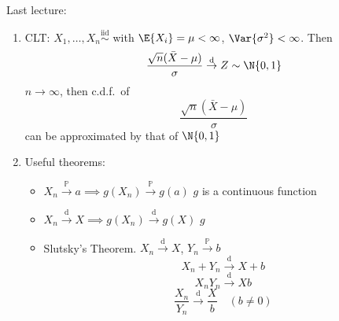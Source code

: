 Last lecture:
\begin{enumerate}
    \item CLT\@: $ X_1,\ldots,X_n \stackrel{\text{iid}}{\sim} $
          with $ \E{X_i}=\mu<\infty $, $ \Var{\sigma^2}<\infty $. Then
          \[ \frac{\sqrt{n}(\bar{X}-\mu)}{\sigma}
              \stackrel{\text{d}}{\to}Z \sim \N{0,1} \]
          $ n\to\infty $, then c.d.f.\ of
          \[ \frac{\sqrt{n}(\bar{X}-\mu)}{\sigma}  \]
          can be approximated by that of $ \N{0,1} $
    \item Useful theorems:
          \begin{itemize}
              \item $ X_n\stackrel{\mathbb{P}}{\to}a\implies
                        g(X_n)\stackrel{\mathbb{P}}{\to}g(a) $ $ g $
                    is a continuous function
              \item $ X_n\stackrel{\text{d}}{\to}X\implies
                        g(X_n)\stackrel{\text{d}}{\to}g(X) $ $ g $
              \item Slutsky's Theorem.
                    $ X_n\stackrel{\text{d}}{\to}X $,
                    $ Y_n\stackrel{\mathbb{P}}{\to}b $
                    \[ X_n+Y_n\stackrel{\text{d}}{\to}X+b \]
                    \[ X_nY_n\stackrel{\text{d}}{\to}Xb \]
                    \[ \frac{X_n}{Y_n} \stackrel{\text{d}}{\to}\frac{X}{b} \quad
                        (b\neq 0) \]
          \end{itemize}
\end{enumerate}
